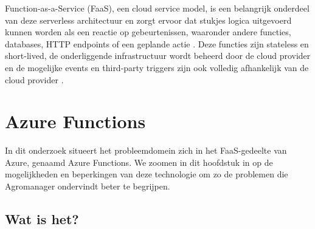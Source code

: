 %

Function-as-a-Service (FaaS), een cloud service model, is een belangrijk onderdeel van deze serverless architectuur en zorgt ervoor dat stukjes logica uitgevoerd kunnen worden als een reactie op gebeurtenissen, waaronder andere functies, databases, HTTP endpoints of een geplande actie \autocite{Yussupov2021}. Deze functies zijn stateless en short-lived, de onderliggende infrastructuur wordt beheerd door de cloud provider en de mogelijke events en third-party triggers zijn ook volledig afhankelijk van de cloud provider \autocite{Yussupov2021}.

\section{Azure Functions}

In dit onderzoek situeert het probleemdomein zich in het FaaS-gedeelte van Azure, genaamd Azure Functions. We zoomen in dit hoofdstuk in op de mogelijkheden en beperkingen van deze technologie om zo de problemen die Agromanager ondervindt beter te begrijpen.

\subsection{Wat is het?}

